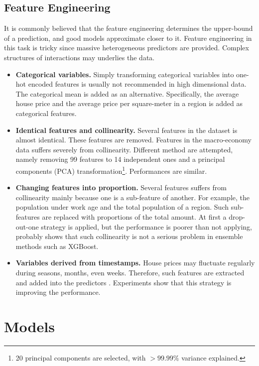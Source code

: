 \documentclass{article}
\begin{document}
\subsection{Feature Engineering}

It is commonly believed that the feature engineering determines the upper-bound of a prediction, and good models approximate closer to it. Feature engineering in this task is tricky since massive heterogeneous predictors are provided. Complex structures of interactions may underlies the data.

\begin{itemize}
\item \textbf{Categorical variables. }
    Simply transforming categorical variables into one-hot encoded features is usually not recommended in high dimensional data. The categorical mean is added as an alternative. Specifically, the average house price and the average price per square-meter in a region is added as categorical features.
\item \textbf{Identical features and collinearity. }
    Several features in the dataset is almost identical. These features are removed. Features in the macro-economy data suffers severely from collinearity. Different method are attempted, namely removing 99 features to 14 independent ones \cite{kerB} and a principal components (PCA) transformation\footnote{20 principal components are selected, with $>99.99\%$ variance explained.}. Performances are similar.
\item \textbf{Changing features into proportion. }
    Several features suffers from collinearity mainly because one is a sub-feature of another. For example, the population under work age and the total population of a region. Such sub-features are replaced with proportions of the total amount. At first a drop-out-one strategy is applied, but the performance is poorer than not applying, probably shows that such collinearity is not a serious problem in ensemble methods such as XGBoost.
\item \textbf{Variables derived from timestamps. }
    House prices may fluctuate regularly during seasons, months, even weeks. Therefore, such features are extracted and added into the predictors \cite{kerB}. Experiments show that this strategy is improving the performance.
\end{itemize}

\section{Models}
\end{document}
